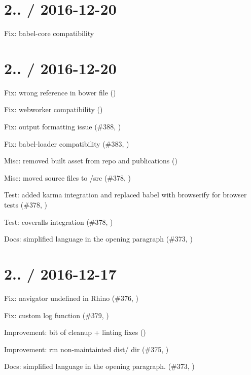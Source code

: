 \section*{2.. / 2016-\/12-\/20 }


\begin{DoxyItemize}
\item Fix\+: babel-\/core compatibility
\end{DoxyItemize}

\section*{2.. / 2016-\/12-\/20 }


\begin{DoxyItemize}
\item Fix\+: wrong reference in bower file ()
\item Fix\+: webworker compatibility ()
\item Fix\+: output formatting issue (\#388, )
\item Fix\+: babel-\/loader compatibility (\#383, )
\item Misc\+: removed built asset from repo and publications ()
\item Misc\+: moved source files to /src (\#378, )
\item Test\+: added karma integration and replaced babel with browserify for browser tests (\#378, )
\item Test\+: coveralls integration (\#378, )
\item Docs\+: simplified language in the opening paragraph (\#373, )
\end{DoxyItemize}

\section*{2.. / 2016-\/12-\/17 }


\begin{DoxyItemize}
\item Fix\+: {\ttfamily navigator} undefined in Rhino (\#376, )
\item Fix\+: custom log function (\#379, )
\item Improvement\+: bit of cleanup + linting fixes ()
\item Improvement\+: rm non-\/maintainted {\ttfamily dist/} dir (\#375, )
\item Docs\+: simplified language in the opening paragraph. (\#373, )
\end{DoxyItemize}

